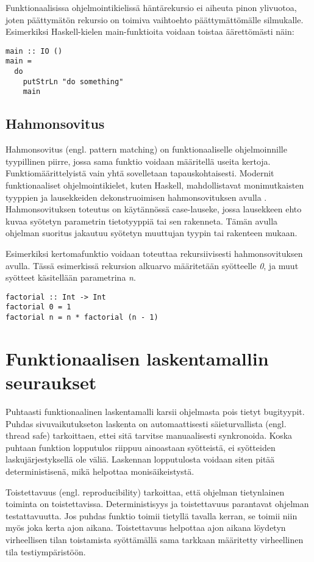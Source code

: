 Funktionaalisissa ohjelmointikielissä häntärekursio ei aiheuta pinon ylivuotoa, joten päättymätön rekursio on toimiva
vaihtoehto päättymättömälle silmukalle. Esimerkiksi Haskell-kielen main-funktioita voidaan toistaa äärettömästi näin:
\begin{verbatim}
main :: IO ()
main =
  do
    putStrLn "do something"
    main
\end{verbatim}

\subsection{Hahmonsovitus}
Hahmonsovitus (engl. pattern matching) on funktionaaliselle ohjelmoinnille tyypillinen piirre, jossa sama funktio
voidaan määritellä useita kertoja. Funktiomäärittelyistä vain yhtä sovelletaan tapauskohtaisesti. Modernit
funktionaaliset ohjelmointikielet, kuten Haskell, mahdollistavat monimutkaisten tyyppien ja lausekkeiden
dekonstruoimisen hahmonsovituksen avulla \cite{learnhaskell}. Hahmonsovituksen toteutus on käytännössä case-lauseke,
jossa lausekkeen ehto kuvaa syötetyn parametrin tietotyyppiä tai sen rakenneta. Tämän avulla ohjelman suoritus jakautuu
syötetyn muuttujan tyypin tai rakenteen mukaan. \cite{hudak}

Esimerkiksi kertomafunktio voidaan toteuttaa rekursiivisesti hahmonsovituksen avulla. Tässä esimerkissä rekursion
alkuarvo määritetään syötteelle \textit{0}, ja muut syötteet käsitellään parametrina \textit{n}.
\begin{verbatim}
factorial :: Int -> Int
factorial 0 = 1
factorial n = n * factorial (n - 1)
\end{verbatim}

\section{Funktionaalisen laskentamallin seuraukset}
Puhtaasti funktionaalinen laskentamalli karsii ohjelmasta pois tietyt bugityypit. Puhdas sivuvaikutukseton laskenta on
automaattisesti säieturvallista (engl. thread safe) tarkoittaen, ettei sitä tarvitse manuaalisesti synkronoida. Koska
puhtaan funktion lopputulos riippuu ainoastaan syötteistä, ei syötteiden laskujärjestyksellä ole väliä. Laskennan
lopputulosta voidaan siten pitää deterministisenä, mikä helpottaa monisäikeistystä.

Toistettavuus (engl. reproducibility) tarkoittaa, että ohjelman tietynlainen toiminta on toistettavissa.
Deterministisyys ja toistettavuus parantavat ohjelman testattavuutta. Jos puhdas funktio toimii tietyllä tavalla kerran,
se toimii niin myös joka kerta ajon aikana. Toistettavuus helpottaa ajon aikana löydetyn virheellisen tilan toistamista
syöttämällä sama tarkkaan määritetty virheellinen tila testiympäristöön. \cite{functionaljava}

